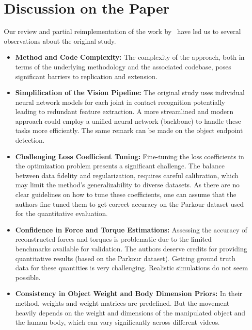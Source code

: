 \section{Discussion on the Paper}
\label{sec:discussion}

Our review and partial reimplementation of the work by~\citet{li2019estimating} have led us to several observations about 
the original study.

\begin{itemize}
    \item \textbf{Method and Code Complexity:} The complexity of the approach, both in terms of the underlying methodology and the associated 
    codebase, poses significant barriers to replication and extension.

    \item \textbf{Simplification of the Vision Pipeline:} The original study uses individual neural network models for each joint in contact recognition
    potentially leading to redundant feature extraction. A more streamlined and modern approach could employ a unified neural network (backbone) to handle 
    these tasks more efficiently. The same remark can be made on the object endpoint detection.

    \item \textbf{Challenging Loss Coefficient Tuning:} Fine-tuning the loss coefficients in the optimization problem presents a significant 
    challenge. The balance between data fidelity and regularization, requires careful calibration, which may 
    limit the method's generalizability to diverse datasets. As there are no clear guidelines on how to tune these coefficients, one can
    assume that the authors fine tuned them to get correct accuracy on the Parkour dataset used for the quantitative evaluation.

    \item \textbf{Confidence in Force and Torque Estimations:} Assessing the accuracy of reconstructed forces and torques is problematic due 
    to the limited benchmarks available for validation. The authors deserve credits for providing quantitative results (based on the Parkour dataset).
    Getting ground truth data for these quantities is very challenging. Realistic simulations do not seem possible.

    \item \textbf{Consistency in Object Weight and Body Dimension Priors:} In their method, weights and weight matrices are predefined. 
    But the movement heavily depends on the weight and dimensions of the manipulated object and the human body, which can vary significantly 
    across different videos. 


\end{itemize}
